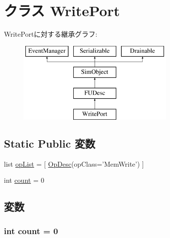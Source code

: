 \hypertarget{classFuncUnitConfig_1_1WritePort}{
\section{クラス WritePort}
\label{classFuncUnitConfig_1_1WritePort}
}
WritePortに対する継承グラフ:\begin{figure}[H]
\begin{center}
\leavevmode
\includegraphics[height=4cm]{classFuncUnitConfig_1_1WritePort}
\end{center}
\end{figure}
\subsection*{Static Public 変数}
\begin{DoxyCompactItemize}
\item 
list \hyperlink{classFuncUnitConfig_1_1WritePort_a31b2f9e3ac9a504397b140f513c469cc}{opList} = \mbox{[} \hyperlink{classOpDesc}{OpDesc}(opClass='MemWrite') \mbox{]}
\item 
int \hyperlink{classFuncUnitConfig_1_1WritePort_ad43c3812e6d13e0518d9f8b8f463ffcf}{count} = 0
\end{DoxyCompactItemize}


\subsection{変数}
\hypertarget{classFuncUnitConfig_1_1WritePort_ad43c3812e6d13e0518d9f8b8f463ffcf}{
\subsubsection[{count}]{\setlength{\rightskip}{0pt plus 5cm}int {\bf count} = 0}}
\label{classFuncUnitConfig_1_1WritePort_ad43c3812e6d13e0518d9f8b8f463ffcf}


